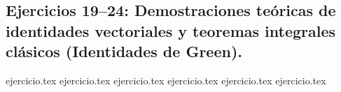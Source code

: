 \subsection*{Ejercicios 19--24: Demostraciones teóricas de identidades vectoriales y teoremas integrales clásicos (Identidades de Green).}
\begin{enumerate}
    \setcounter{enumi}{18}
    {ejercicio.tex}
    {ejercicio.tex}
    {ejercicio.tex}
    {ejercicio.tex}
    {ejercicio.tex}
    {ejercicio.tex}
\end{enumerate}
